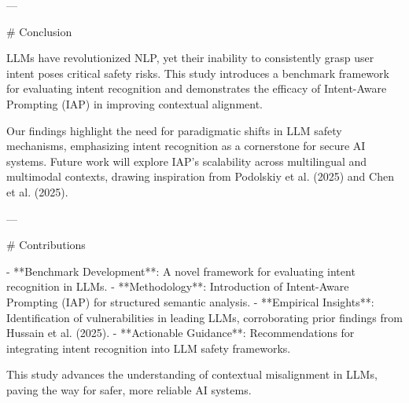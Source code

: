 ---

# Conclusion  

LLMs have revolutionized NLP, yet their inability to consistently grasp user intent poses critical safety risks. This study introduces a benchmark framework for evaluating intent recognition and demonstrates the efficacy of Intent-Aware Prompting (IAP) in improving contextual alignment.  

Our findings highlight the need for paradigmatic shifts in LLM safety mechanisms, emphasizing intent recognition as a cornerstone for secure AI systems. Future work will explore IAP's scalability across multilingual and multimodal contexts, drawing inspiration from Podolskiy et al. (2025) and Chen et al. (2025).  

---

# Contributions  

- **Benchmark Development**: A novel framework for evaluating intent recognition in LLMs.  
- **Methodology**: Introduction of Intent-Aware Prompting (IAP) for structured semantic analysis.  
- **Empirical Insights**: Identification of vulnerabilities in leading LLMs, corroborating prior findings from Hussain et al. (2025).  
- **Actionable Guidance**: Recommendations for integrating intent recognition into LLM safety frameworks.  

This study advances the understanding of contextual misalignment in LLMs, paving the way for safer, more reliable AI systems.  